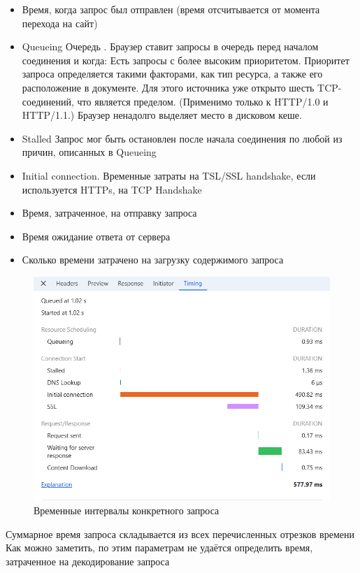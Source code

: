 \documentclass[12pt]{article}
\begin{document}
\begin{itemize}[label=-]
    \item Время, когда запрос был отправлен (время отсчитывается от момента перехода на сайт)
    \item Queueing Очередь . Браузер ставит запросы в очередь перед началом соединения и когда:
          Есть запросы с более высоким приоритетом. Приоритет запроса определяется такими факторами, как тип ресурса, а также его расположение в документе.
          Для этого источника уже открыто шесть TCP-соединений, что является пределом. (Применимо только к HTTP/1.0 и HTTP/1.1.)
          Браузер ненадолго выделяет место в дисковом кеше.
    \item Stalled Запрос мог быть остановлен после начала соединения по любой из причин, описанных в Queueing
    \item Initial connection. Временные затраты на TSL/SSL handshake, если используется HTTPs, на TCP Handshake
    \item Время, затраченное, на отправку запроса
    \item Время ожидание ответа от сервера
    \item Сколько времени затрачено на загрузку содержимого запроса
\end{itemize}

\begin{figure}[H]
    \centering
    \includegraphics[width=1\textwidth]{../images/network__timing.png}
    \caption{Временные интервалы конкретного запроса}
\end{figure}

Суммарное время запроса складывается из всех перечисленных отрезков времени
Как можно заметить, по этим параметрам не удаётся определить время,
затраченное на декодирование запроса
\end{document}
